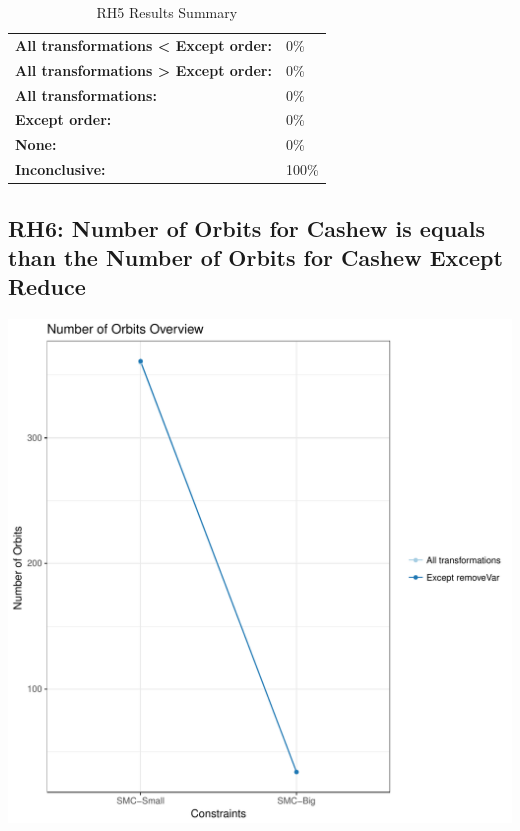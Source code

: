 \documentclass{article}\usepackage[]{graphicx}\usepackage[]{color}
\makeatletter
\def\maxwidth{ %
  \ifdim\Gin@nat@width>\linewidth
    \linewidth
  \else
    \Gin@nat@width
  \fi
}
\newenvironment{knitrout}{}{} %
\makeatother
\begin{document}
	\begin{table}[H]
	\centering
	\caption{RH5 Results Summary}
	\begin{tabular}{ll}
	\textbf{All transformations \textless{} Except order:}& 0\% \\
	\textbf{All transformations \textgreater{} Except order:}& 0\%\\
	\textbf{All transformations:} & 0\%\\
	\textbf{Except order:} & 0\%\\
	\textbf{None:}& 0\%\\
	\textbf{Inconclusive:}& 100\%
			
	
	\end{tabular}
	\end{table}
	
	
	



\subsection{RH6: Number of Orbits for Cashew is equals than the Number of Orbits for Cashew Except Reduce}


 
\begin{knitrout}
\color{fgcolor}
\includegraphics[width=\maxwidth]{figure/overview_RH6-1} 

\end{knitrout}
 	
\end{document}
